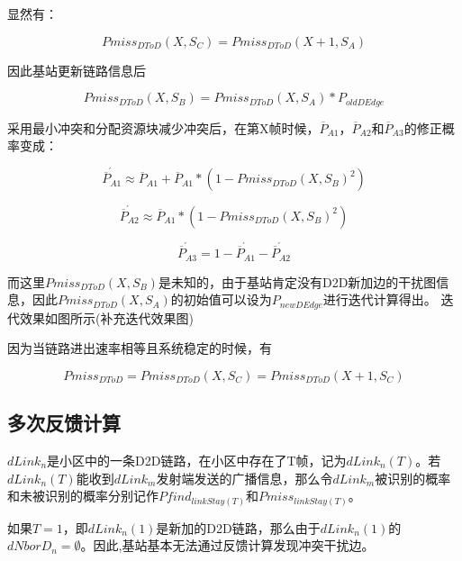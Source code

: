 \documentclass[figurelist,tablelist,algorithmlist,nomlist,masters]{seuthesix}
\begin{document}
	显然有：

	\begin{equation}\label{eq3.1}
	Pmis{s_{DToD}}(X,S{_C}) = Pmis{s_{DToD}}(X + 1,S{_A})
	\end{equation}

	因此基站更新链路信息后

	\begin{equation}\label{eq3.2}
	Pmis{s_{DToD}}(X,S{_B}) = Pmis{s_{DToD}}(X,S{_A})*{P_{oldDEdge}}
	\end{equation}

	采用最小冲突和分配资源块减少冲突后，在第X帧时候，${\overline P _{A1}}$，${\overline P _{A2}}$和${\overline P _{A3}}$的修正概率变成：

	\begin{equation}\label{eq3.1}
	\acute{\overline P _{A1}} \approx {\overline P _{A1}} + {\overline P _{A1}} * (1 - Pmis{s_{DToD}}{(X,S{_B})^2})
	\end{equation}

	\begin{equation}\label{eq3.1}
	\acute{\overline P _{A2}} \approx {\overline P _{A1}} * (1 - Pmis{s_{DToD}}{(X,S{_B})^2})
	\end{equation}

	\begin{equation}\label{eq3.1}
	\acute{\overline P _{A3}} = 1 - \acute{\overline P _{A1}} - \acute{\overline P _{A2}}
	\end{equation}

	而这里$Pmis{s_{DToD}}{(X,S{_B})}$是未知的，由于基站肯定没有D2D新加边的干扰图信息，因此$Pmis{s_{DToD}}(X,S{_A})$的初始值可以设为${P_{newDEdge}}$进行迭代计算得出。
	迭代效果如图所示(补充迭代效果图)

	因为当链路进出速率相等且系统稳定的时候，有

	\begin{equation}\label{eq3.1}
	Pmis{s_{DToD}} = Pmis{s_{DToD}}(X,S{_C}) = Pmis{s_{DToD}}(X + 1,S{_C})
	\end{equation}

	\subsection{多次反馈计算}
	$dLink_n$是小区中的一条D2D链路，在小区中存在了T帧，记为$dLink_n(T)$。若$dLink_n(T)$能收到$dLink_m$发射端发送的广播信息，那么令$dLink_m$被识别的概率和未被识别的概率分别记作$Pfind_{linkStay(T)}$和$Pmiss_{linkStay(T)}$。

	如果$T = 1$，即$dLink_n(1)$是新加的D2D链路，那么由于$dLink_n(1)$的$dNborD_n = \emptyset$。因此,基站基本无法通过反馈计算发现冲突干扰边。
\end{document}
